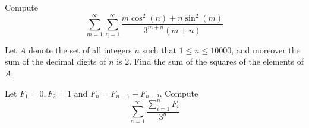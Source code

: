 \documentclass[11pt][mast]{lucky}
\begin{document}
\begin{prob}[MMATHS 2018]{4}
Compute
$$\sum_{m=1}^{\infty} \sum_{n=1}^{\infty} \frac{m\cos^2(n)+n\sin^2(m)}{3^{m+n}(m+n)}$$
\end{prob}

\begin{prob}{8}
Let $A$ denote the set of all integers $n$ such that $1 \leq n \leq 10000$, and moreover the sum of the decimal digits of $n$ is $2$. Find the sum of the squares of the elements of $A$.
\end{prob}

\begin{prob}[BMT 2018]{14}
Let $F_{1}=0, F_{2}=1$ and $F_{n}=F_{n-1}+F_{n-2}$. Compute
$$\sum_{n=1}^{\infty} \frac{\sum_{i=1}^{n} F_{i}}{3^{n}}$$
\end{prob}
\end{document}
